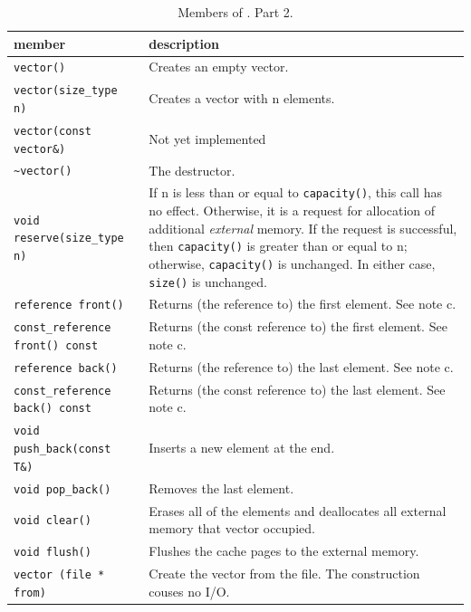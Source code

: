 \documentclass[twoside]{book}
\begin{document}
\begin{table}[h]
\begin{center}
\caption{Members of \xvector. Part 2.}
\label{vectormembers2}
\begin{tabular}{|p{6cm}|p{5cm}|}
\hline
member & description  \\
\hline\hline
\texttt{vector()} & Creates an empty vector. \\
\hline
\texttt{vector(size\_type n)} & Creates a vector with n elements. \\
\hline
\texttt{vector(const vector\&)} & Not yet implemented \\
\hline
\texttt{\textasciitilde vector()} & The destructor. \\
\hline
\texttt{void reserve(size\_type n)} & If n is less than or equal to
\texttt{capacity()}, this call has no effect. Otherwise, it is a request for
allocation of additional \emph{external} memory. If the request is successful, then
\texttt{capacity()} is greater than or equal to n; otherwise,
\texttt{capacity()} is 
unchanged. In either case, \texttt{size()} is unchanged. \\
\hline
\texttt{reference front()} & Returns (the reference to) the first
element. See note c.\\
\hline
\texttt{const\_reference front() const} & Returns (the const reference to)
the first element. See note c.\\ 
\hline
\texttt{reference back()} & Returns (the reference to) the last
element. See note c.\\
\hline
\texttt{const\_reference back() const} & Returns (the const reference to)
the last element. See note c.\\ 
\hline
\texttt{void push\_back(const T\&)} & Inserts a new element at the
end. \\
\hline
\texttt{void pop\_back()} & Removes the last element. \\
\hline
\texttt{void clear()} & Erases all of the elements and deallocates all
external memory that vector occupied.\\
\hline
\texttt{void flush()} & Flushes the cache pages to the external
memory. \\
\hline
\texttt{vector (file * from)} & Create the vector from the
file. The construction couses no I/O.\\
\hline
\end{tabular}
\end{center}
\end{table}
\end{document}

